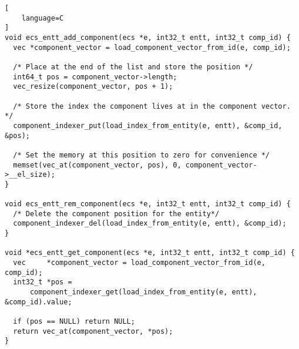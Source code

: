 \begin{lstlisting}[
    language=C
]
void ecs_entt_add_component(ecs *e, int32_t entt, int32_t comp_id) {
  vec *component_vector = load_component_vector_from_id(e, comp_id);

  /* Place at the end of the list and store the position */
  int64_t pos = component_vector->length;
  vec_resize(component_vector, pos + 1);

  /* Store the index the component lives at in the component vector. */
  component_indexer_put(load_index_from_entity(e, entt), &comp_id, &pos);

  /* Set the memory at this position to zero for convenience */
  memset(vec_at(component_vector, pos), 0, component_vector->__el_size);
}

void ecs_entt_rem_component(ecs *e, int32_t entt, int32_t comp_id) {
  /* Delete the component position for the entity*/
  component_indexer_del(load_index_from_entity(e, entt), &comp_id);
}

void *ecs_entt_get_component(ecs *e, int32_t entt, int32_t comp_id) {
  vec     *component_vector = load_component_vector_from_id(e, comp_id);
  int32_t *pos =
      component_indexer_get(load_index_from_entity(e, entt), &comp_id).value;

  if (pos == NULL) return NULL;
  return vec_at(component_vector, *pos);
}
\end{lstlisting}

